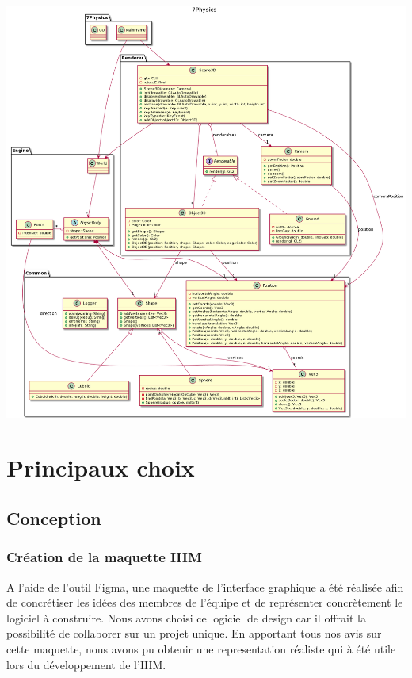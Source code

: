 \documentclass[11pt]{report}
\begin{document}
\begin{center}
  \includegraphics[width=18cm]{./diagramme_classe.png}
\end{center}

\chapter{Principaux choix}

\section{Conception}

\subsection{Création de la maquette IHM}

A l'aide de l'outil Figma, une maquette de l'interface graphique a été réalisée afin de concrétiser les idées des membres de l'équipe
et de représenter concrètement le logiciel à construire. Nous avons choisi ce logiciel de design car il offrait la possibilité de
collaborer sur un projet unique. En apportant tous nos avis sur cette maquette, nous avons pu obtenir une representation réaliste qui à
été utile lors du développement de l'IHM.
\end{document}
